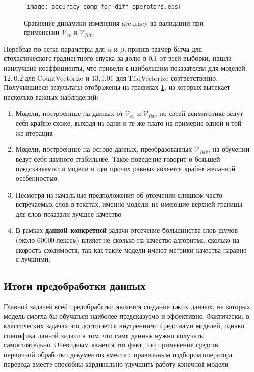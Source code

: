 \documentclass{article}
\begin{document}
        \begin{figure}
            \centering
            \texttt{[image: accuracy\_comp\_for\_diff\_operators.eps]}
            \caption{Сравнение динамики изменения accuracy на валидации при применении $\mathcal{V}_{cv}$ и $\mathcal{V}_{fidv}$}
            \label{fig:accuracy_comp_for_diff_operators}
        \end{figure}

        Перебрав по сетке параметры для $\alpha$ и $\beta$, приняв размер батча для стохастического градиентного спуска за долю в 0.1 от всей выборки, нашли наилучшие коэффициенты, что привели к наибольшим показателям для моделей: $12, 0.2$ для CountVectorize и $13, 0.01$ для TfidVectorize соответственно. Получившиеся результаты отображены на графиках \ref{fig:accuracy_comp_for_diff_operators}, из которых вытекает несколько важных наблюдений:

        \begin{enumerate}
            \item Модели, построенные на данных от $\mathcal{V}_{cv}$ и $\mathcal{V}_{fidv}$ по своей асимптотике ведут себя крайне схоже, выходя на одни и те же плато на примерно одной и той же итерации
            \item Модели, построенные на основе данных, преобразованных $\mathcal{V}_{fidv}$, на обучении ведут себя намного стабильнее. Такое поведение говорит о большей предсказуемости модели и при прочих равных является крайне желанной особенностью.
            \item Несмотря на начальные предположения об отсечении слишком часто встречаемых слов в текстах, именно модели, не имеющие верхней границы для слов показали лучшее качество
            \item В рамках \textbf{данной конкретной} задачи отсечение большинства слов-шумов (около 60000 лексем) влияет не сколько на качество алгоритма, сколько на скорость сходимости, так как такие модели имеют метрики качества наравне с лучшими.
        \end{enumerate}

    \subsection{Итоги предобработки данных}

        Главной задачей всей предобработки является создание таких данных, на которых модель смогла бы обучаться наиболее предсказуемо и эффективно. Фактически, в классических задачах это достигается внутренними средствами моделей, однако специфика данной задачи в том, что сами данные нужно получать самостоятельно. Очевидным кажется тот факт, что применение средств первичной обработки документов вместе с правильным подбором оператора перевода вместе способны кардинально улучшить работу конечной модели. 
\end{document}
